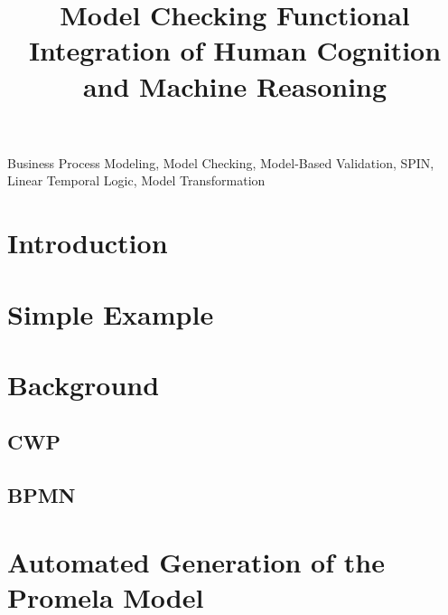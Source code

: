 \documentclass[conference]{IEEEtran}
\begin{document}
\title{
  Model Checking Functional Integration of Human Cognition and Machine Reasoning
}

\author{
\and
{}
}

\maketitle

\begin{abstract}
    
\end{abstract}

\begin{IEEEkeywords}
    Business Process Modeling, Model Checking, Model-Based Validation, SPIN, Linear Temporal Logic, Model Transformation
\end{IEEEkeywords}

\section{Introduction}


\section{Simple Example}
\label{sec:simpleExample}


\section{Background}
\label{sec:background}


\subsection{CWP}
\label{sec:backgroundCWP}


\subsection{BPMN}
\label{sec:backgroundBPMN}


\section{Automated Generation of the Promela Model}
\label{sec:automaticGeneration}

\end{document}
